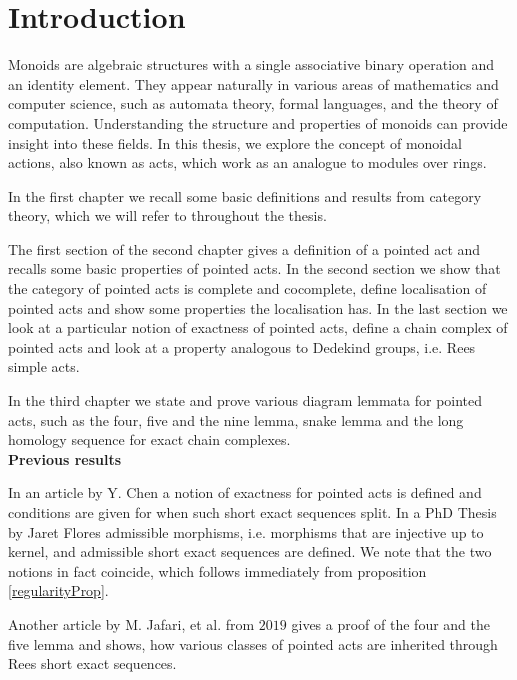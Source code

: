 \chapter*{Introduction}

Monoids are algebraic structures with a single associative binary operation and an identity element. 
They appear naturally in various areas of mathematics and computer science, such as automata theory, formal languages, and the theory of computation. 
Understanding the structure and properties of monoids can provide insight into these fields.
In this thesis, we explore the concept of monoidal actions, also known as acts, which work as an analogue to modules over rings.\par 

In the first chapter we recall some basic definitions and results from category theory, which we will refer to throughout the thesis.\par  
The first section of the second chapter gives a definition of a pointed act and recalls some basic properties of pointed acts. In the second section we show that the category of pointed acts is complete and 
cocomplete, define localisation of pointed acts and show some properties the localisation has. In the last section we look at a particular 
notion of exactness of pointed acts, define a chain complex of pointed acts and look at a property analogous to Dedekind groups, i.e. Rees simple acts.\par 
In the third chapter we state and prove various diagram lemmata for pointed acts, such as the four, five and the nine lemma, snake lemma and the long homology sequence for
exact chain complexes.\\
\textbf{Previous results}\par 
    In an article by Y. Chen \cite{Chen02} a notion of exactness for pointed acts is defined and conditions are given for when such 
    short exact sequences split. In a PhD Thesis by Jaret Flores \cite{Flores15} admissible morphisms, i.e. morphisms that are injective up to kernel,
    and admissible short exact sequences are defined. We note that the two notions in fact coincide, which follows immediately from proposition \ref{regularityProp}.\par 
    Another article by M. Jafari, et al. \cite{Jafari19} from $2019$ gives a proof of the four and the five lemma and shows, how various classes of 
    pointed acts are inherited through Rees short exact sequences.